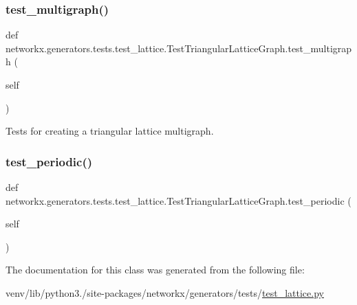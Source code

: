 \subsubsection{\texorpdfstring{test\+\_\+multigraph()}{test\_multigraph()}}
{\footnotesize\ttfamily def networkx.\+generators.\+tests.\+test\+\_\+lattice.\+Test\+Triangular\+Lattice\+Graph.\+test\+\_\+multigraph (\begin{DoxyParamCaption}\item[{}]{self }\end{DoxyParamCaption})}

\begin{DoxyVerb}Tests for creating a triangular lattice multigraph.\end{DoxyVerb}
 \mbox{\label{classnetworkx_1_1generators_1_1tests_1_1test__lattice_1_1TestTriangularLatticeGraph_aca6f13c26db22e6f2d7349d2d55a63e7}} 
\subsubsection{\texorpdfstring{test\+\_\+periodic()}{test\_periodic()}}
{\footnotesize\ttfamily def networkx.\+generators.\+tests.\+test\+\_\+lattice.\+Test\+Triangular\+Lattice\+Graph.\+test\+\_\+periodic (\begin{DoxyParamCaption}\item[{}]{self }\end{DoxyParamCaption})}



The documentation for this class was generated from the following file\+:\begin{DoxyCompactItemize}
\item 
venv/lib/python3./site-\/packages/networkx/generators/tests/\hyperlink{test__lattice_8py}{test\+\_\+lattice.\+py}\end{DoxyCompactItemize}
